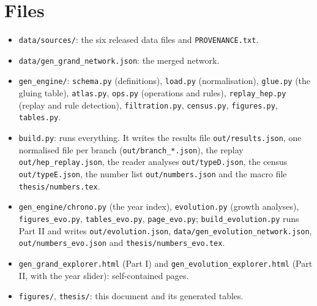 \documentclass[11pt,a4paper,twoside,openany]{report}
\theoremstyle{plain}
\theoremstyle{definition}
\theoremstyle{remark}
\begin{document}
\section{Files}
\begin{itemize}[nosep]
\item \texttt{data/sources/}: the six released data files and \texttt{PROVENANCE.txt}.
\item \texttt{data/gen\_grand\_network.json}: the merged network.
\item \texttt{gen\_engine/}: \texttt{schema.py} (definitions), \texttt{load.py} (normalisation), \texttt{glue.py} (the gluing table), \texttt{atlas.py}, \texttt{ops.py} (operations and rules), \texttt{replay\_hep.py} (replay and rule detection), \texttt{filtration.py}, \texttt{census.py}, \texttt{figures.py}, \texttt{tables.py}.
\item \texttt{build.py}: runs everything. It writes the results file \texttt{out/results.json}, one normalised file per branch (\texttt{out/branch\_*.json}), the replay \texttt{out/hep\_replay.json}, the reader analyses \texttt{out/typeD.json}, the census \texttt{out/typeE.json}, the number list \texttt{out/numbers.json} and the macro file \texttt{thesis/numbers.tex}.
\item \sloppy \texttt{gen\_engine/chrono.py} (the year index), \texttt{evolution.py} (growth analyses), \texttt{figures\_evo.py}, \texttt{tables\_evo.py}, \texttt{page\_evo.py}; \texttt{build\_evolution.py} runs Part II and writes \texttt{out/evolution.json}, \texttt{data/gen\_evolution\_network.json}, \texttt{out/numbers\_evo.json} and \texttt{thesis/numbers\_evo.tex}.
\item \texttt{gen\_grand\_explorer.html} (Part I) and \texttt{gen\_evolution\_explorer.html} (Part II, with the year slider): self-contained pages.
\item \texttt{figures/}, \texttt{thesis/}: this document and its generated tables.
\end{itemize}



\end{document}
